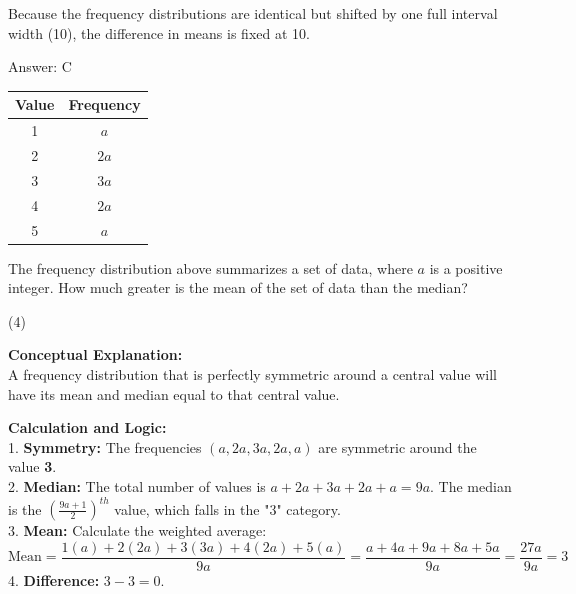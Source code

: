 \documentclass[11pt,paper=a4,answers]{exam}
\begin{document}
\begin{questions}
\begin{solution}
\vspace{20pt}

Because the frequency distributions are identical but shifted by one full interval width (10), the difference in means is fixed at 10.

\vspace{30pt}

Answer: \colorbox{yellow!100}{C}
\end{solution}

\vspace{60pt}

\question
\begin{center}
\begin{tabular}{|c|c|}
\hline
Value & Frequency \\ \hline
1 & $a$ \\ \hline
2 & $2a$ \\ \hline
3 & $3a$ \\ \hline
4 & $2a$ \\ \hline
5 & $a$ \\ \hline
\end{tabular}
\end{center}
The frequency distribution above summarizes a set of data, where $a$ is a positive integer. How much greater is the mean of the set of data than the median?
\begin{tasks}(4)
\end{tasks}

\begin{solution}
\textbf{Conceptual Explanation:} \\
A frequency distribution that is perfectly symmetric around a central value will have its mean and median equal to that central value.

\vspace{30pt}

\textbf{Calculation and Logic:} \\
1. \textbf{Symmetry:} The frequencies $(a, 2a, 3a, 2a, a)$ are symmetric around the value \textbf{3}. \\
2. \textbf{Median:} The total number of values is $a+2a+3a+2a+a = 9a$. The median is the $(\frac{9a+1}{2})^{th}$ value, which falls in the "3" category. \\
3. \textbf{Mean:} Calculate the weighted average:
\[ \text{Mean} = \frac{1(a) + 2(2a) + 3(3a) + 4(2a) + 5(a)}{9a} = \frac{a + 4a + 9a + 8a + 5a}{9a} = \frac{27a}{9a} = 3 \]
4. \textbf{Difference:} $3 - 3 = 0$.


\end{solution}
\end{questions}
\end{document}

